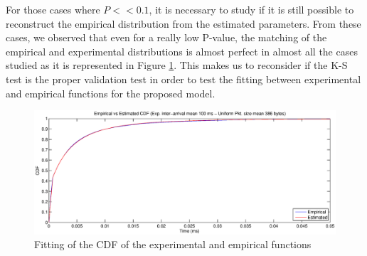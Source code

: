 For those cases where ${P<<0.1}$, it is necessary to study if it is still possible to reconstruct the empirical distribution from the estimated parameters. From these cases, we observed that even for a really low P-value, the matching of the empirical and experimental distributions is almost perfect in almost all the cases studied as it is represented in Figure \ref{fig:ks_fail}. This makes us to reconsider if the \acs{K-S} test is the proper validation test in order to test the fitting between experimental and empirical functions for the proposed model.


\begin{figure}[h]
	\centering
	\includegraphics[scale=0.28, trim = 0mm 0mm 6mm 5mm, clip]{images/results/GlobalView/KS/ks_fail}
	\caption{Fitting of the \acs{CDF} of the experimental and empirical functions}
	\label{fig:ks_fail}
\end{figure}
